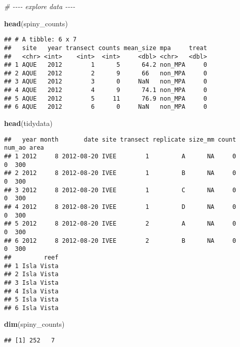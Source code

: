 \documentclass[
]{article}
\newenvironment{Shaded}{\begin{snugshade}}{\end{snugshade}}
\newcommand{\CommentTok}[1]{\textcolor[rgb]{0.56,0.35,0.01}{\textit{#1}}}
\newcommand{\FunctionTok}[1]{\textcolor[rgb]{0.13,0.29,0.53}{\textbf{#1}}}
\newcommand{\NormalTok}[1]{#1}
\begin{document}
\begin{Shaded}
\begin{Highlighting}[]
\CommentTok{\# {-}{-}{-}{-} explore data {-}{-}{-}{-}}

\FunctionTok{head}\NormalTok{(spiny\_counts)}
\end{Highlighting}
\end{Shaded}

\begin{verbatim}
## # A tibble: 6 x 7
##   site   year transect counts mean_size mpa     treat
##   <chr> <int>    <int>  <int>     <dbl> <chr>   <dbl>
## 1 AQUE   2012        1      5      64.2 non_MPA     0
## 2 AQUE   2012        2      9      66   non_MPA     0
## 3 AQUE   2012        3      0     NaN   non_MPA     0
## 4 AQUE   2012        4      9      74.1 non_MPA     0
## 5 AQUE   2012        5     11      76.9 non_MPA     0
## 6 AQUE   2012        6      0     NaN   non_MPA     0
\end{verbatim}

\begin{Shaded}
\begin{Highlighting}[]
\FunctionTok{head}\NormalTok{(tidydata)}
\end{Highlighting}
\end{Shaded}

\begin{verbatim}
##   year month       date site transect replicate size_mm count num_ao area
## 1 2012     8 2012-08-20 IVEE        1         A      NA     0      0  300
## 2 2012     8 2012-08-20 IVEE        1         B      NA     0      0  300
## 3 2012     8 2012-08-20 IVEE        1         C      NA     0      0  300
## 4 2012     8 2012-08-20 IVEE        1         D      NA     0      0  300
## 5 2012     8 2012-08-20 IVEE        2         A      NA     0      0  300
## 6 2012     8 2012-08-20 IVEE        2         B      NA     0      0  300
##         reef
## 1 Isla Vista
## 2 Isla Vista
## 3 Isla Vista
## 4 Isla Vista
## 5 Isla Vista
## 6 Isla Vista
\end{verbatim}

\begin{Shaded}
\begin{Highlighting}[]
\FunctionTok{dim}\NormalTok{(spiny\_counts)}
\end{Highlighting}
\end{Shaded}

\begin{verbatim}
## [1] 252   7
\end{verbatim}
\end{document}
